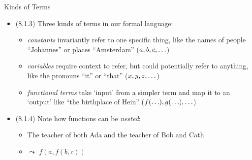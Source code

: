 \begin{frame}{Kinds of Terms}

	\begin{itemize}%
	\itemsep=16pt
	
		\item (8.1.3) Three kinds of terms in our formal language:
		
		\begin{itemize}
		
			\item \emph{constants} invariantly refer to one specific thing, like the names of people ``Johannes'' or places ``Amsterdam'' ($a,b,c,\mathellipsis$)

			\item \emph{variables} require context to refer, but could potentially refer to anything, like the pronouns ``it'' or ``that''  ($x,y,z,\mathellipsis$)

			\item \emph{functional terms} take `input' from a simpler term and map it to an `output' like ``the birthplace of Hein'' ($f(\mathellipsis),g(\mathellipsis),\mathellipsis$)
		
		\end{itemize}
		
		\item (8.1.4) Note how functions can be \emph{nested}:
		
			\begin{itemize}
			
				\item[] The teacher of both Ada and the teacher of Bob and Cath
				
				\item[] \; $\leadsto$  $f(a,f(b,c))$ 
			
			\end{itemize}
	
	\end{itemize}

\end{frame}


